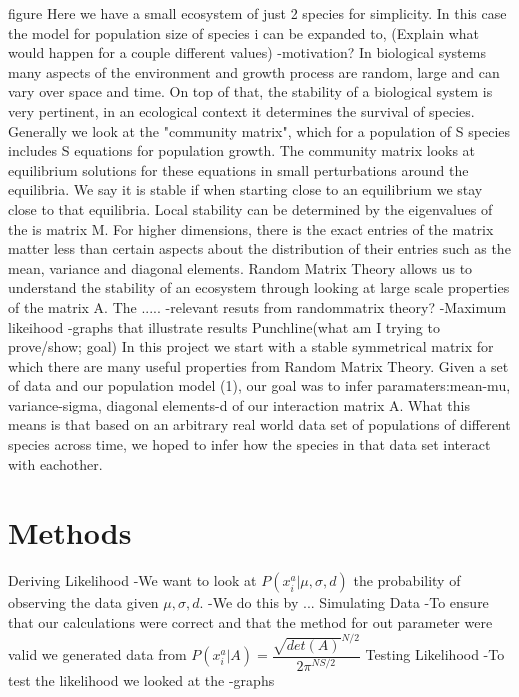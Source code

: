 \documentclass{article}
\begin{document}
\hfill\break figure \hfill\break \hfill\break
Here we have a small ecosystem of just 2 species for simplicity. In this case the model for population size of species i can be expanded to, 
\hfill\break
\hfill\break
\hfill\break
\hfill\break
(Explain what would happen for a couple different values)\hfill\break
-motivation?\hfill\break
In biological systems many aspects of the environment and growth process are random, large and can vary over space and time. On top of that, the stability of a biological system is very pertinent, in an ecological context it determines the survival of species. Generally we look at the "community matrix", which for a population of S species includes S equations for population growth. The community matrix looks at equilibrium solutions for these equations in small perturbations around the equilibria. We say it is stable if when starting close to an equilibrium we stay close to that equilibria. Local stability can be determined by the eigenvalues of the is matrix M.  For higher dimensions, there is the exact entries of the matrix matter less than certain aspects about the distribution of their entries such as the mean, variance and diagonal elements. Random Matrix Theory allows us to understand the stability of an ecosystem through looking at large scale properties of the matrix A. The .....
-relevant resuts from randommatrix theory?\hfill\break
-Maximum likeihood
-graphs that illustrate results\hfill\break
Punchline(what am I trying to prove/show; goal)\hfill\break
In this project we start with a stable symmetrical matrix for which there are many useful properties from Random Matrix Theory. Given a set of data and our population model (1), our goal was to infer paramaters:mean-mu, variance-sigma, diagonal elements-d of our interaction matrix A. What this means is that based on an arbitrary real world data set of populations of different species across time, we hoped to infer how the species in that data set interact with eachother. 



\section{Methods}
Deriving Likelihood\hfill\break
-We want to look at $P(x_i^a|\mu,\sigma, d)$ the probability of observing the data given $\mu,\sigma,d$.
-We do this by ... \hfill\break
Simulating Data\hfill\break
-To ensure that our calculations were correct and that the method for out parameter were valid we generated data from $P(x_i^a| A)=\dfrac{\sqrt{det(A)}^{N/2}}{2\pi^{NS/2}}$ \hfill\break
Testing Likelihood\hfill\break
-To test the likelihood we looked at the 
-graphs\hfill\break
\hfill\break
\end{document}
